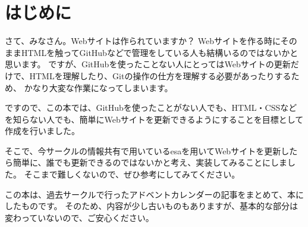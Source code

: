 \chapter{はじめに}

さて、みなさん。Webサイトは作られていますか？
Webサイトを作る時にそのままHTMLを触ってGitHubなどで管理をしている人も結構いるのではないかと思います。
ですが、GitHubを使ったことない人にとってはWebサイトの更新だけで、HTMLを理解したり、Gitの操作の仕方を理解する必要があったりするため、
かなり大変な作業になってしまいます。

ですので、この本では、GitHubを使ったことがない人でも、HTML・CSSなどを知らない人でも、簡単にWebサイトを更新できるようにすることを目標として作成を行いました。

そこで、今サークルの情報共有で用いているesaを用いてWebサイトを更新したら簡単に、誰でも更新できるのではないかと考え、実装してみることにしました。
そこまで難しくないので、ぜひ参考にしてみてください。

この本は、過去サークルで行ったアドベントカレンダーの記事をまとめて、本にしたものです。
そのため、内容が少し古いものもありますが、基本的な部分は変わっていないので、ご安心ください。